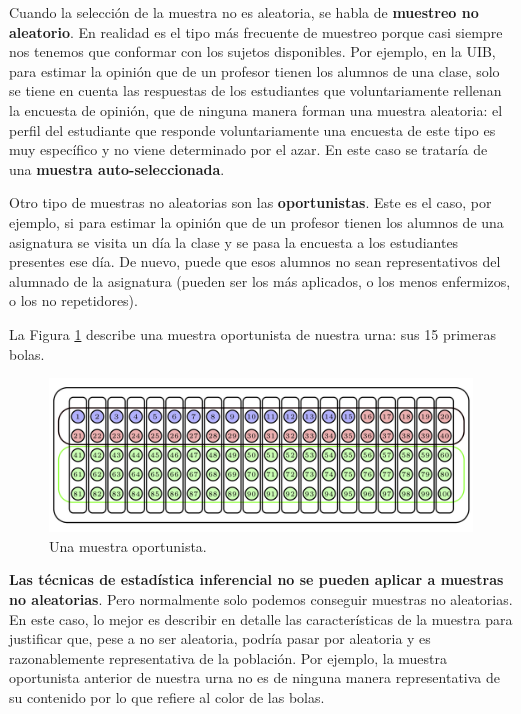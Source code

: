 \documentclass[
]{book}
\theoremstyle{definition}
\theoremstyle{definition}
\theoremstyle{definition}
\theoremstyle{definition}
\theoremstyle{remark}
\begin{document}
Cuando la selección de la muestra no es aleatoria, se habla de \textbf{muestreo no aleatorio}. En realidad es el tipo más frecuente de muestreo porque casi siempre nos tenemos que conformar con los sujetos disponibles. Por ejemplo, en la UIB, para estimar la opinión que de un profesor tienen los alumnos de una clase, solo se tiene en cuenta las respuestas de los estudiantes que voluntariamente rellenan la encuesta de opinión, que de ninguna manera forman una muestra aleatoria: el perfil del estudiante que responde voluntariamente una encuesta de este tipo es muy específico y no viene determinado por el azar. En este caso se trataría de una \textbf{muestra auto-seleccionada}.

Otro tipo de muestras no aleatorias son las \textbf{oportunistas}. Este es el caso, por ejemplo, si para estimar la opinión que de un profesor tienen los alumnos de una asignatura se visita un día la clase y se pasa la encuesta a los estudiantes presentes ese día. De nuevo, puede que esos alumnos no sean representativos del alumnado de la asignatura (pueden ser los más aplicados, o los menos enfermizos, o los no repetidores).

La Figura \ref{fig:oport} describe una muestra oportunista de nuestra urna: sus 15 primeras bolas.

\begin{figure}

{\centering \includegraphics[width=0.8\linewidth]{INREMDN_files/figure-html/oport} 

}

\caption{Una muestra oportunista.}\label{fig:oport}
\end{figure}

\textbf{Las técnicas de estadística inferencial no se pueden aplicar a muestras no aleatorias}. Pero normalmente solo podemos conseguir muestras no aleatorias. En este caso, lo mejor es describir en detalle las características de la muestra para justificar que, pese a no ser aleatoria, podría pasar por aleatoria y es razonablemente representativa de la población. Por ejemplo, la muestra oportunista anterior de nuestra urna no es de ninguna manera representativa de su contenido por lo que refiere al color de las bolas.
\end{document}
